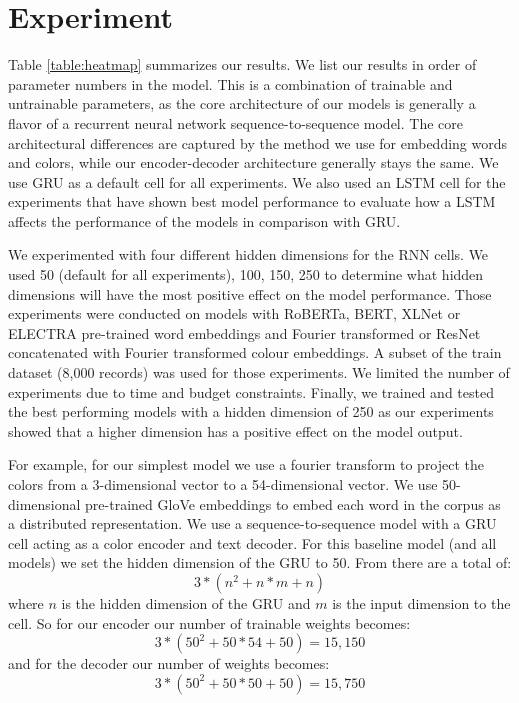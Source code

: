 \section{Experiment}

Table \ref{table:heatmap} summarizes our results. We list our results in order of parameter numbers in the model. This is a combination of trainable and untrainable parameters, as the core architecture of our models is generally a flavor of a recurrent neural network sequence-to-sequence model. The core architectural differences are captured by the method we use for embedding words and colors, while our encoder-decoder architecture generally stays the same. We use GRU as a default cell for all experiments. We also used an LSTM cell for the experiments that have shown best model performance to evaluate how a LSTM affects the performance of the models in comparison with GRU.

\par
We experimented with four different hidden dimensions for the RNN cells. We used 50 (default for all experiments), 100, 150, 250 to determine what hidden dimensions will have the most positive effect on the model performance. Those experiments were conducted on models with RoBERTa, BERT, XLNet or ELECTRA pre-trained word embeddings and Fourier transformed or ResNet concatenated with Fourier transformed colour embeddings. A subset of the train dataset (8,000 records) was used for those experiments. We limited the number of experiments due to time and budget constraints. Finally, we trained and tested the best performing models with a hidden dimension of 250 as our experiments showed that a higher dimension has a positive effect on the model output.

\par
For example, for our simplest model we use a fourier transform to project the colors from a 3-dimensional vector to a 54-dimensional vector. We use 50-dimensional pre-trained GloVe embeddings to embed each word in the corpus as a distributed representation. We use a sequence-to-sequence model with a GRU cell acting as a color encoder and text decoder.  For this baseline model (and all models) we set the hidden dimension of the GRU to 50. From \citep{dey-2017-gru} there are a total of:
\begin{equation}
  3*(n^2 + n*m +n)
\end{equation}
where \(n\) is the hidden dimension of the GRU and \(m\) is the input dimension to the cell. So for our encoder our number of trainable weights becomes:
\begin{equation}
  3*(50^2 + 50*54 +50) = 15,150
\end{equation}
and for the decoder our number of weights becomes:
\begin{equation}
  3*(50^2 + 50*50 +50) = 15,750
\end{equation}

